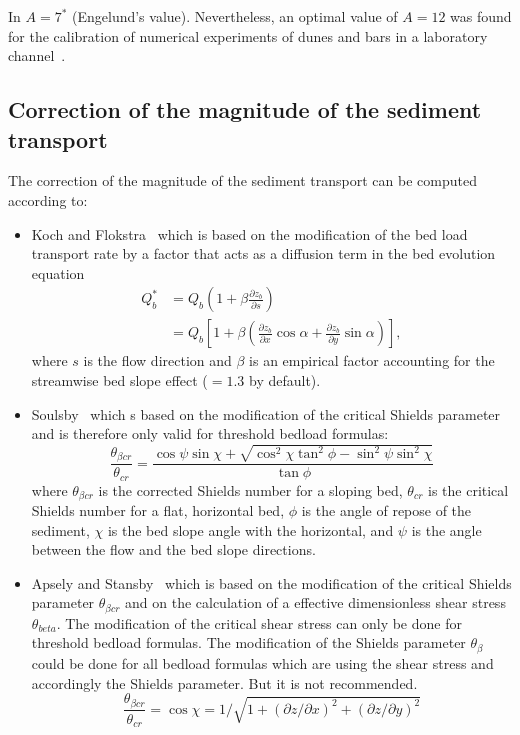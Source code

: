In \gaia{} $A=7^*$ (Engelund's value). Nevertheless, an optimal value of $A=12$ was found for the calibration of numerical experiments of dunes and bars in a laboratory channel~\cite{Mendoza15}.

\subsection{Correction of the magnitude of the sediment transport}
The correction of the magnitude of the sediment transport can be computed according to:
\begin{itemize}
\item  Koch and Flokstra~\cite{KochFlokstra80} which is based on the modification of the bed load transport rate by a factor that acts as a diffusion term in the bed evolution equation
\begin{equation}
\begin{array}{ll} \displaystyle
Q_b^* &= Q_{b}\left(1+\beta\frac{\partial z_b}{\partial s}\right) \\
    &= Q_{b}\left[1 + \beta \left(\frac{\partial z_b}{\partial x} \cos\alpha + \frac{\partial z_b}{\partial y} \sin\alpha\right)\right],
\end{array}
\end{equation}
where $s$ is the flow direction and $\beta$ is an empirical factor accounting for the streamwise bed slope effect ($=1.3$ by default).
\medskip

\item Soulsby~\cite{Soulsby97} which s based on the modification of the critical Shields parameter and is therefore only valid for threshold bedload formulas:
\begin{equation*}
\frac{\theta_{\beta cr}}{\theta_{cr}} = \frac{\cos\psi \sin\chi +
\sqrt{\cos^2\chi \tan^2\phi - \sin^2\psi \sin^2\chi}}{\tan
\phi}
\end{equation*}
where $\theta_{\beta cr}$ is the corrected  Shields number for a sloping bed, $\theta_{cr}$ is the critical Shields number for a flat, horizontal bed, $\phi$ is the angle of repose of the sediment, $\chi$ is the bed slope angle with the horizontal, and $\psi$ is the angle between the flow and the bed slope directions.
\medskip

\item  Apsely and Stansby~\cite{ApsleyStansby2008} which is  based on the modification of the critical Shields parameter $\theta_{\beta cr}$ and on the calculation of a effective dimensionless shear stress $\theta_{beta}$.
The modification of the critical shear stress can only be done for threshold bedload formulas. The modification of the Shields parameter $\theta_{\beta}$ could be done for all bedload formulas which are using the shear stress and accordingly the Shields parameter. But it is not recommended.
\begin{equation*}
\frac{\theta_{\beta cr}}{\theta_{cr}} = \cos\chi = 1 / \sqrt{1 + (\partial z /\partial x)^2 + (\partial z/ \partial y)^2 }
\end{equation*}


\end{itemize}
